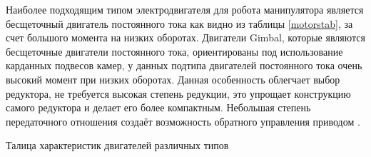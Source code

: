 Наиболее подходящим типом электродвигателя для робота манипулятора является бесщеточный двигатель постоянного тока как видно из таблицы \ref{motorstab}, за счет большого момента на низких оборотах. Двигатели Gimbal, которые являются бесщеточные двигатели постоянного тока, ориентированы под использование карданных подвесов камер, у данных подтипа двигателей постоянного тока очень высокий момент при низких оборотах. Данная особенность облегчает выбор редуктора, не требуется высокая степень редукции, это упрощает конструкцию самого редуктора и делает его более компактным. Небольшая степень передаточного отношения создаёт возможность обратного управления приводом \citep{8867893}.

\begin{table}[H]
	\centering
	\caption{Талица характеристик двигателей различных типов}\label{motorstab}
	\begin{adjustbox}{width={\textwidth}}


\end{adjustbox}
\end{table}
